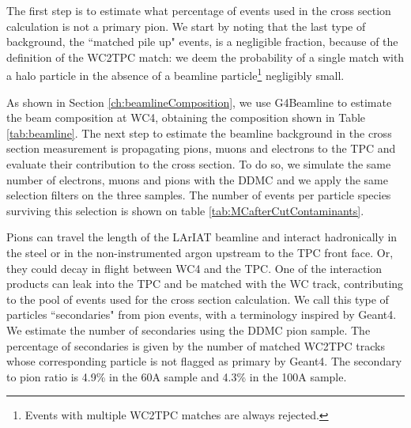 The first step is to estimate what percentage of events used in the cross section calculation is not a primary pion.  We start by noting that the last type of background, the ``matched pile up" events, is a negligible fraction, because of the definition of the WC2TPC match: we deem the probability of a single match with a halo particle in the absence of a beamline particle\footnote{ Events with multiple WC2TPC matches are always rejected.} negligibly small. %

As shown in Section \ref{ch:beamlineComposition}, we use G4Beamline to estimate the beam composition at WC4, obtaining the composition shown in Table \ref{tab:beamline}.
The next step to estimate the beamline background in the cross section measurement is propagating pions, muons and electrons to the TPC and evaluate their contribution to the cross section. To do so, we simulate the same number of electrons, muons and pions with the DDMC and we apply the same selection filters on the three samples. The number of events per particle species surviving this selection is shown on table \ref{tab:MCafterCutContaminants}.

Pions can travel the length of the LArIAT beamline and interact hadronically in the steel or in the non-instrumented argon upstream to the TPC front face. Or, they could decay in flight between WC4 and the TPC. One of the interaction products can leak into the TPC and be matched with the WC track, contributing to the pool of events used for the cross section calculation. We call this type of particles ``secondaries" from pion events, with a terminology inspired by Geant4. 
We estimate the number of secondaries using the DDMC pion sample.  The percentage of secondaries is given by the number of matched WC2TPC tracks whose corresponding particle is not flagged as primary by Geant4.  The secondary to pion ratio is 4.9\% in the 60A sample and 4.3\% in the 100A sample.


